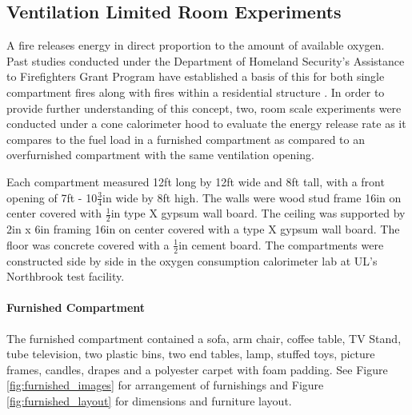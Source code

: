 \documentclass{article}
\begin{document}
\clearpage

\subsection{Ventilation Limited Room Experiments}
A fire releases energy in direct proportion to the amount of available oxygen. Past studies conducted under the Department of Homeland Security's Assistance to Firefighters Grant Program have established a basis of this for both single compartment fires along with fires within a residential structure \cite{DHS2008} \cite{DHS2010}. In order to provide further understanding of this concept, two, room scale experiments were conducted under a cone calorimeter hood to evaluate the energy release rate as it compares to the fuel load in a furnished compartment as compared to an overfurnished compartment with the same ventilation opening.

Each compartment measured 12ft long by 12ft wide and 8ft tall, with a front opening of 7ft - 10$\frac{3}{4}$in wide by 8ft high. The walls were wood stud frame 16in on center covered with $\frac{1}{2}$in type X gypsum wall board. The ceiling was supported by 2in x 6in framing 16in on center covered with a type X gypsum wall board. The floor was concrete covered with a $\frac{1}{2}$in cement board. The compartments were constructed side by side in the oxygen consumption calorimeter lab at UL's Northbrook test facility. 

\paragraph{Furnished Compartment} \mbox{}

The furnished compartment contained a sofa, arm chair, coffee table, TV Stand, tube television, two plastic bins, two end tables, lamp, stuffed toys, picture frames, candles, drapes and a polyester carpet with foam padding. See Figure \ref{fig:furnished_images} for arrangement of furnishings and Figure \ref{fig:furnished_layout} for dimensions and furniture layout.
\end{document}
